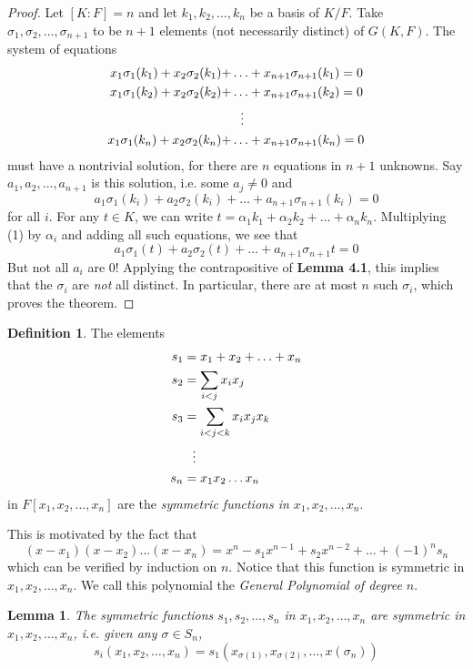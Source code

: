 \documentclass[12pt,leqno]{article}
\numberwithin{equation}{section}
\theoremstyle{plain}
\newtheorem{lem}[thm]{Lemma}
\theoremstyle{definition}
\newtheorem*{Def}{Definition}
\theoremstyle{remark}
\begin{document}
\begin{proof}
 Let $[K:F]=n$ and let $k_1,k_2,\hdots,k_n$ be a basis of $K/F$. Take $\sigma_1,\sigma_2,\hdots,\sigma_{n+1}$ to be $n+1$ elements (not necessarily distinct) of $G(K,F)$. The system of equations \begin{align*}x_1\sigma_1(k_1)+x_2\sigma_2(k_1)+&\hdots+x_{n+1}\sigma_{n+1}(k_1)=0\\x_1\sigma_1(k_2)+x_2\sigma_2(k_2)+&\hdots+x_{n+1}\sigma_{n+1}(k_2)=0\\&\hskip.1in\vdots\\x_1\sigma_1(k_n)+x_2\sigma_2(k_n)+&\hdots+x_{n+1}\sigma_{n+1}(k_n)=0\end{align*} must have a nontrivial solution, for there are $n$ equations in $n+1$ unknowns. Say $a_1,a_2,\hdots,a_{n+1}$ is this solution, i.e. some $a_j\not=0$ and \[\tag{1}a_1\sigma_1(k_i)+a_2\sigma_2(k_i)+\hdots+a_{n+1}\sigma_{n+1}(k_i)=0\] for all $i$. For any $t\in K$, we can write $t=\alpha_1k_1+\alpha_2k_2+\hdots+\alpha_nk_n$. Multiplying (1) by $\alpha_i$ and adding all such equations, we see that \[a_1\sigma_1(t)+a_2\sigma_2(t)+\hdots+a_{n+1}\sigma_{n+1}t=0\] But not all $a_i$ are 0! Applying the contrapositive of \textbf{Lemma 4.1}, this implies that the $\sigma_i$ are \textit{not} all distinct. In particular, there are at most $n$ such $\sigma_i$, which proves the theorem.
\end{proof}

\begin{Def}
 The elements \begin{align*}s_1&=x_1+x_2+\hdots+x_n\\s_2&=\sum_{i<j}x_ix_j\\s_3&=\sum_{i<j<k}x_ix_jx_k\\&\hskip.1in\vdots\\s_n&=x_1x_2\hdots x_n\end{align*} in $F[x_1,x_2,\hdots,x_n]$ are the \textit{symmetric functions in $x_1,x_2,\hdots,x_n$}.
\end{Def}

This is motivated by the fact that \[(x-x_1)(x-x_2)\hdots(x-x_n)=x^n-s_1x^{n-1}+s_2x^{n-2}+\hdots+(-1)^ns_n\] which can be verified by induction on $n$. Notice that this function is symmetric in $x_1,x_2,\hdots,x_n$. We call this polynomial the \textit{General Polynomial of degree $n$}. 

\begin{lem}
The symmetric functions $s_1,s_2,\hdots,s_n$ in $x_1,x_2,\hdots,x_n$ are symmetric in $x_1,x_2,\hdots,x_n$, i.e. given any $\sigma\in S_n$, \[s_i(x_1,x_2,\hdots,x_n)=s_1(x_{\sigma(1)},x_{\sigma(2)},\hdots,x(\sigma_{n}))\]
\end{lem}
\end{document}
